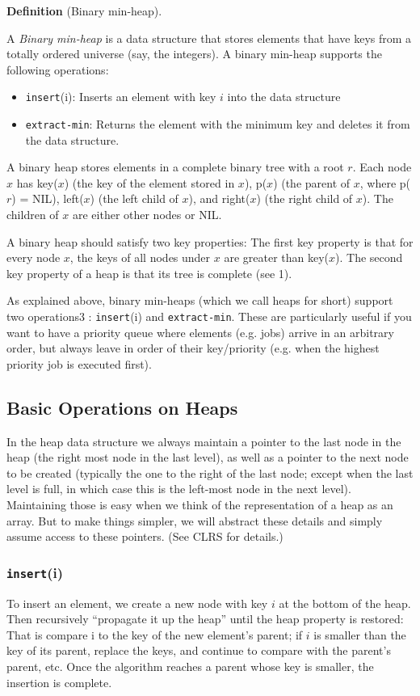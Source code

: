\documentclass [12pt]{article}
\begin{document}
\textbf{Definition} (Binary min-heap). 

A \textit{Binary min-heap} is a data structure that stores elements that have keys from a totally ordered universe (say, the integers). A binary min-heap supports the following operations: 

\begin{itemize}
  \item \texttt{insert}(i): Inserts an element with key $i$ into the data structure
  \item \texttt{extract-min}: Returns the element with the minimum key and deletes it from the data structure. 
\end{itemize}

A binary heap stores elements in a complete binary tree with a root $r$. Each node $x$ has key($x$) (the key of the element stored in $x$), p($x$) (the parent of $x$, where p($r$) = NIL), left($x$) (the left child of $x$), and right($x$) (the right child of $x$). The children of $x$ are either other nodes or NIL.

A binary heap should satisfy two key properties: The first key property is that for every node $x$, the keys of all nodes under $x$ are greater than key($x$). The second key property of a heap is that its tree is complete (see 1). 

As explained above, binary min-heaps (which we call heaps for short) support two operations3 : \texttt{insert}(i) and \texttt{extract-min}. These are particularly useful if you want to have a priority queue where elements (e.g. jobs) arrive in an arbitrary order, but always leave in order of their key/priority (e.g. when the highest priority job is executed first).

\subsection{Basic Operations on Heaps}
In the heap data structure we always maintain a pointer to the last node in the heap (the right most node in the last level), as well as a pointer to the next node to be created (typically the one to the right of the last node; except when the last level is full, in which case this is the left-most node in the next level). Maintaining those is easy when we think of the
representation of a heap as an array. But to make things simpler, we will abstract these details and simply assume access to these pointers. (See CLRS for details.)

\subsubsection{\texttt{insert}(i)} 
To insert an element, we create a new node with key $i$ at the bottom of the heap. Then recursively “propagate it up the heap” until the heap property is restored: That is compare i to the key of the new element's parent; if $i$ is smaller than the key of its parent, replace the keys, and continue to compare with the parent's parent, etc. Once the algorithm reaches a parent whose key is smaller, the insertion is complete.
\end{document}

